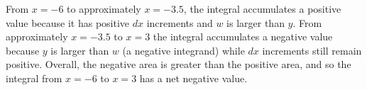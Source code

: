 From $x = -6$ to approximately $x = -3.5$, the integral accumulates a positive value because it has positive $dx$ increments and $w$ is larger than $y$.  From approximately $x = -3.5$ to $x = 3$ the integral accumulates a negative value because $y$ is larger than $w$ (a negative integrand) while $dx$ increments still remain positive.  Overall, the negative area is greater than the positive area, and so the integral from $x = -6$ to $x = 3$ has a net negative value.











